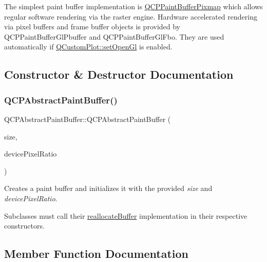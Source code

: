 The simplest paint buffer implementation is \hyperlink{class_q_c_p_paint_buffer_pixmap}{Q\+C\+P\+Paint\+Buffer\+Pixmap} which allows regular software rendering via the raster engine. Hardware accelerated rendering via pixel buffers and frame buffer objects is provided by Q\+C\+P\+Paint\+Buffer\+Gl\+Pbuffer and Q\+C\+P\+Paint\+Buffer\+Gl\+Fbo. They are used automatically if \hyperlink{class_q_custom_plot_a7db1adc09016329f3aef7c60da935789}{Q\+Custom\+Plot\+::set\+Open\+Gl} is enabled. 

\subsection{Constructor \& Destructor Documentation}
\mbox{\label{class_q_c_p_abstract_paint_buffer_a3ce532c12f10b81697108835755641e2}} 
\subsubsection{\texorpdfstring{Q\+C\+P\+Abstract\+Paint\+Buffer()}{QCPAbstractPaintBuffer()}}
{\footnotesize\ttfamily Q\+C\+P\+Abstract\+Paint\+Buffer\+::\+Q\+C\+P\+Abstract\+Paint\+Buffer (\begin{DoxyParamCaption}\item[{const Q\+Size \&}]{size,  }\item[{double}]{device\+Pixel\+Ratio }\end{DoxyParamCaption})\hspace{0.3cm}{\ttfamily [explicit]}}

Creates a paint buffer and initializes it with the provided {\itshape size} and {\itshape device\+Pixel\+Ratio}.

Subclasses must call their \hyperlink{class_q_c_p_abstract_paint_buffer_aee7506a52bd7e5a07c2af27935eb13e7}{reallocate\+Buffer} implementation in their respective constructors. 

\subsection{Member Function Documentation}
\mbox{\label{class_q_c_p_abstract_paint_buffer_a9e253f4541dfc01992b77e8830bd7722}} 
